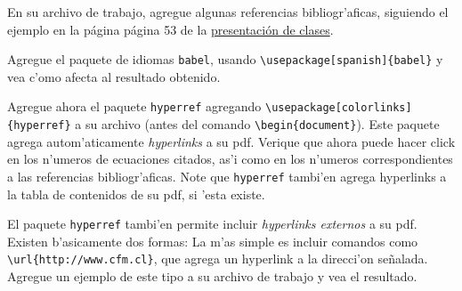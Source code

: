\documentclass[11pt]{exam}
\begin{document}
\begin{questions}

\item En su archivo de trabajo, agregue algunas referencias bibliogr'aficas, siguiendo el ejemplo en la página página 53 de la \href{https://udec.instructure.com/courses/40179/pages/latex-pdf-presentacion?module_item_id=1465499}{presentación de clases}.

\item Agregue el paquete de idiomas \texttt{babel}, usando \verb|\usepackage[spanish]{babel}| y vea c'omo afecta al resultado obtenido.

\item Agregue ahora el paquete \texttt{hyperref} agregando 
\verb|\usepackage[colorlinks]{hyperref}| a su archivo (antes del comando \verb|\begin{document}|). Este paquete agrega autom'aticamente \textit{hyperlinks} a su pdf. Verique que ahora puede hacer click en los n'umeros de ecuaciones citados, as'i como en los n'umeros correspondientes a las referencias bibliogr'aficas. Note que \texttt{hyperref} tambi'en agrega hyperlinks a la tabla de contenidos de su pdf, si 'esta existe.

\item El paquete \texttt{hyperref} tambi'en permite incluir \textit{hyperlinks externos} a su pdf. Existen b'asicamente dos formas: La m'as simple es incluir comandos como \verb|\url{http://www.cfm.cl}|, que agrega un hyperlink a la direcci'on se\~nalada. Agregue un ejemplo de este tipo a su archivo de trabajo y vea el resultado.


\end{questions}
\end{document}
